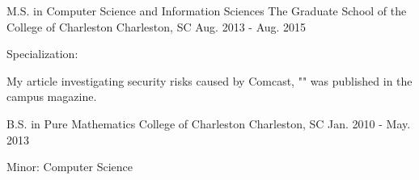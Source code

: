 

\begin{cventries}

  \cventry
    {M.S. in Computer Science and Information Sciences} %
    {The Graduate School of the College of Charleston} %
    {Charleston, SC} %
    {Aug. 2013 - Aug. 2015} %
    {
      \begin{cvitems} %
        \item {Specialization: }
        \item {My article investigating security risks caused by Comcast, "" was published in the campus magazine.}
      \end{cvitems}
    }

  \cventry
    {B.S. in Pure Mathematics} %
    {College of Charleston} %
    {Charleston, SC} %
    {Jan. 2010 - May. 2013} %
    {
      \begin{cvitems} %
        \item {Minor: Computer Science}
      \end{cvitems}
    }

\end{cventries}
